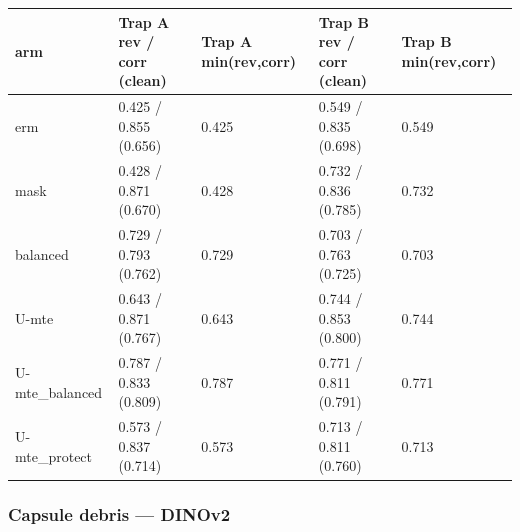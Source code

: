 {{ %
\begin{longtable}[]{@{}lllll@{}}
\toprule\noalign{}
arm & Trap A rev / corr (clean) & Trap A min(rev,corr) & Trap B rev / corr (clean) & Trap B min(rev,corr) \\
\midrule\noalign{}
\endhead
\bottomrule\noalign{}
\endlastfoot
erm & 0.425 / 0.855 (0.656) & 0.425 & 0.549 / 0.835 (0.698) & 0.549 \\
mask & 0.428 / 0.871 (0.670) & 0.428 & 0.732 / 0.836 (0.785) & 0.732 \\
balanced & 0.729 / 0.793 (0.762) & 0.729 & 0.703 / 0.763 (0.725) & 0.703 \\
U-mte & 0.643 / 0.871 (0.767) & 0.643 & 0.744 / 0.853 (0.800) & 0.744 \\
U-mte\_balanced & 0.787 / 0.833 (0.809) & 0.787 & 0.771 / 0.811 (0.791) & 0.771 \\
U-mte\_protect & 0.573 / 0.837 (0.714) & 0.573 & 0.713 / 0.811 (0.760) & 0.713 \\
\end{longtable}
}

\subsubsection{Capsule debris --- DINOv2}\label{capsule-debris--dinov2}

}

